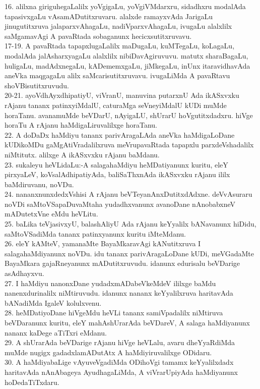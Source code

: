 \documentclass{article}
\begin{document}
16. alilxna giriguhegaLalilx yoVgigaLu, yoVgiVMdarxru, sidadhxru modalAda tapasivxgaLu vAsamADutitxruvaru. alalxde ramayxvAda JarigaLu jinugutitxruva jalaparxvAhagaLu, nadiVparxvAhagaLu, ivugaLu alalxlilx saMgamavAgi A pavaRtada sobaganunx hecicxsutitxruvavu.\\
17-19. A pavaRtada tapapxlugaLalilx maDugaLu, kuMTegaLu, koLagaLu, modalAda jalAsharxyagaLu alalxlilx nibiDavAgiruvuvu. matutx sharaBagaLu, huligaLu, madAdxnegaLu, kADememxgaLu, jiMkegaLu, inUnx itaravidhavAda aneVka maqgagaLu alilx saMcarisutitxruvavu. ivugaLiMda A pavaRtavu shoVBisutitxruvudu.\\
20-21. ayoVdhAyxdhipatiyU, viVranU, manuvina putarxnU Ada ikASxvxku rAjanu tananx patinxyiMdalU, caturaMga seVneyiMdalU kUDi muMde horaTanu. avanamuMde beVDarU, nAyigaLU, shUrarU hoVgutitxdadxru. hiVge horaTu A rAjanu haMdigaLiruvalilxge horaTanu.\\
22. A doDaDx haMdiyu tananx parivAragaLAda aneVka haMdigaLoDane kUDikoMDu gaMgAtiVradalilxruva meVrupavaRtada tapapxlu parxdeVshadalilx niMtitutx. alilxge A ikASxvxku rAjanu baMdanu.\\
23. sukaleyu heVLidaLu:-A salagahaMdiyu heMDatiyanunx kuritu, eleY pirxyaLeV, koVsalAdhipatiyAda, baliSaThxnAda ikASxvxku rAjanu ililx baMdiruvanu, noVDu.\\
24. nananxnunxdedxVshisi A rAjanu beVTeyanAnxDutitxdAdxne. deVvAsuraru noVDi saMtoVSapaDuvaMtaha yudadhxvanunx avanoDane nAnobabxneV mADutetxVne eMdu heVLitu.\\
25. baLika teVjasivxyU, balashAliyU Ada rAjanu keYyalilx bANavanunx hiDidu, saMtoVSadiMda tananx patinxyanunx kuritu iMteMdanu.\\
26. eleY kAMteV, yamanaMte BayaMkaravAgi kANutitxruva I salagahaMdiyanunx noVDu. idu tananx parivAragaLoDane kUDi, meVGadaMte BayaMkara gajaRneyanunx mADutitxruvudu. idanunx edurisalu beVDarige asAdhayxvu.\\
27. I haMdiyu nanonxDane yudadxmADabeVkeMdeV ililxge baMdu nanenxdurinalilx niMtiruvudu. idanunx nananx keYyalilxruva haritavAda bANadiMda IgaleV kolulxvenu.\\
28. heMDatiyoDane hiVgeMdu heVLi tananx samiVpadalilx niMtiruva beVDaranunx kuritu, eleY mahAshUrarAda beVDareV, A salaga haMdiyanunx nananx kaDege aTiTxri eMdanu.\\
29. A shUrarAda beVDarige rAjanu hiVge heVLalu, avaru dheYyaRdiMda muMde nugigx gadadxlamADutAtx A haMdiyiruvalilxge ODidaru.\\
30. A haMdiyabaLige vAyuveVgadiMda ODihoVgi tamamx keYyalilxdadx haritavAda nAnAbageya AyudhagaLiMda, A viVrarUpiyAda haMdiyanunx hoDedaTiTxdaru.\\
\end{document}

